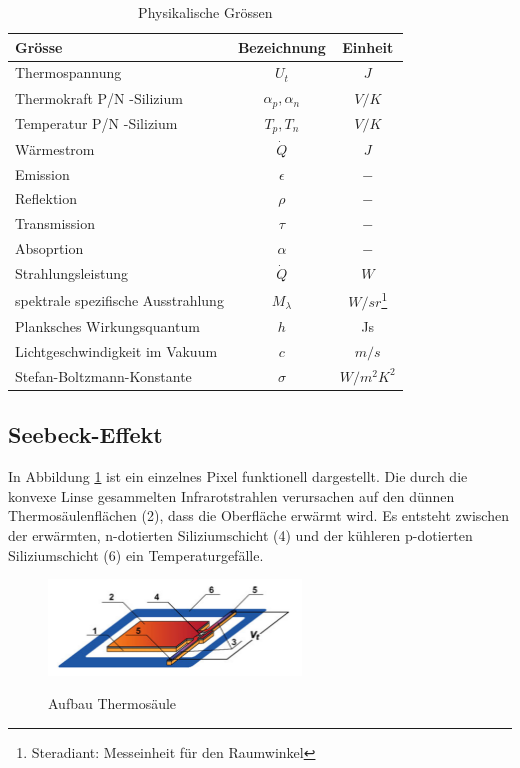 \begin{table}[H]
	\centering
	\begin{tabular}{l|c|c}
		\rowcolor{gray} Grösse &  Bezeichnung  & Einheit \\
		\hline 
		Thermospannung &  $ U_{t}$ & $J$  \\ 
		\rowcolor{gray} Thermokraft P/N -Silizium  & $\alpha_{p},\alpha_{n}$ & $V/K$\\	
		Temperatur P/N -Silizium &  $T_{p},T_{n}$ & $V/K$ \\
		\rowcolor{gray}Wärmestrom &  $\dot{Q}$ & $J$  \\ 
		Emission & $\epsilon$ & $-$\\	
		\rowcolor{gray}Reflektion &  $\rho $ & $-$ \\
		Transmission & $\tau$ & $-$\\
		\rowcolor{gray}Absoprtion &  $\alpha$ & $-$  \\ 
		Strahlungsleistung & $\dot{Q}$ & $W$\\
		\rowcolor{gray}spektrale spezifische Ausstrahlung &  $M_{\lambda }$ & $W/sr$\footnote[2]{Steradiant: Messeinheit für den Raumwinkel} \\
		Planksches Wirkungsquantum &  $ h$ & Js \\ 
		\rowcolor{gray} Lichtgeschwindigkeit im Vakuum & $c $ & $ m/s$ \\ 
 		Stefan-Boltzmann-Konstante & $\sigma$ & $ W/m^2K^2 $ \\ 
	\end{tabular}
	\caption{Physikalische Grössen}
	\label{tab:Legende Physikalische Grössen} 
\end{table} 


\subsection{Seebeck-Effekt}
\label{subsec:seebeck}
In Abbildung \ref{fig:AufbauThermo} ist ein einzelnes Pixel funktionell dargestellt. Die durch die konvexe Linse gesammelten Infrarotstrahlen verursachen auf den dünnen Thermosäulenflächen (2), dass die Oberfläche erwärmt wird. Es entsteht zwischen der erwärmten, n-dotierten Siliziumschicht (4) und der kühleren p-dotierten Siliziumschicht (6) ein Temperaturgefälle.   

\begin{figure}[H]
	\centering
	\includegraphics[width=0.6\textwidth]
	{fig/Mems_Thermopile.PNG}
	\caption[Aufbau Thermosäulenelement]{Aufbau Thermosäule} \protect\cite{AMG8834}
	\label{fig:AufbauThermo}
\end{figure}

